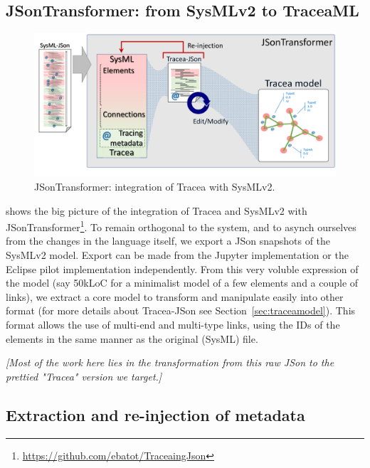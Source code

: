 
\subsection{JSonTransformer: from SysMLv2 to TraceaML}
\begin{figure}[h]     
	\centering
	\includegraphics[width=.85\linewidth]{images/JSonTransformer-intern.pdf}
	\caption{JSonTransformer: integration of Tracea with SysMLv2.}
	\label{fig:jsontransformer}
\end{figure}

 shows the big picture of the integration of Tracea and SysMLv2 with JSonTransformer\footnote{\url{https://github.com/ebatot/TraceaingJson}}. To remain orthogonal to the system, and to asynch ourselves from the changes in the language itself, we export a JSon snapshots of the SysMLv2 model. Export can be made from the Jupyter implementation or the Eclipse pilot implementation independently. From this very voluble expression of the model (say 50kLoC for a minimalist model of a few elements and a couple of links), we extract a core model to transform and manipulate easily into other format (for more details about Tracea-JSon see Section~\ref{sec:traceamodel}). This format allows the use of multi-end and multi-type links, using the IDs of the elements in the same manner as the original (SysML) file. 

\textit{[Most of the work here lies in the transformation from this raw JSon to the prettied "Tracea" version we target.]}


\subsection{Extraction and re-injection of metadata}

